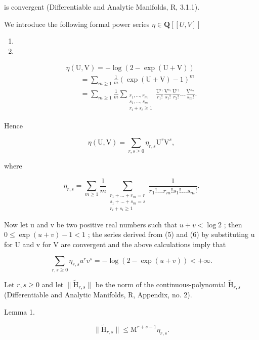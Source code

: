 is convergent (Differentiable and Analytic Manifolds, R, 3.1.1).

We introduce the following formal power series \(\eta\in\mathbf{Q}[[U,V]]\)

\begin{enumerate}
\def\labelenumi{(\arabic{enumi})}
\setcounter{enumi}{3}
\tightlist
\item
\item
\end{enumerate}

\[
\begin{array}{l}\eta (\mathrm{U},\mathrm{V}) = -\log (2 - \exp (\mathrm{U} + \mathrm{V}))\\ \qquad = \sum_{m\geqslant 1}\frac{1}{m} (\exp (\mathrm{U} + \mathrm{V}) - 1)^{m}\\ \qquad = \sum_{m\geqslant 1}\frac{1}{m}\sum_{\substack{r_{1},\ldots ,r_{m}\\ s_{1},\ldots ,s_{m}\\ r_{i} + s_{i}\geqslant 1}}\frac{\mathrm{U}^{r_{1}}}{r_{1}!}\frac{\mathrm{V}^{s_{1}}}{s_{1}!}\frac{\mathrm{U}^{r_{2}}}{r_{2}!}\dots \frac{\mathrm{V}^{s_{m}}}{s_{m}!}. \end{array}\tag{6}
\]

Hence

\[
\eta (\mathrm{U}, \mathrm{V}) = \sum_ {r, s \geqslant 0} \eta_ {r, s} \mathrm{U} ^ {r} \mathrm{V} ^ {s},\tag{7}
\]

where

\[
\eta_{r,s} = \sum_{m\geqslant 1}\frac{1}{m}\sum_{\substack{r_{1} + \dots +r_{m} = r\\ s_{1} + \dots +s_{m} = s\\ r_{i} + s_{i}\geqslant 1}}\frac{1}{r_{1}!\ldots r_{m}!s_{1}!\ldots s_{m}!}.\tag{8}
\]

Now let u and v be two positive real numbers such that \(u + v < \log 2\) ; then \(0 \leqslant \exp(u + v) - 1 < 1\) ; the series derived from (5) and (6) by substituting u for U and v for V are convergent and the above calculations imply that

\[
\sum_ {r, s \geqslant 0} \eta_ {r, s} u ^ {r} v ^ {s} = - \log (2 - \exp (u + v)) <   + \infty .\tag{9}
\]

Let \(r, s \geqslant 0\) and let \(\| \tilde{\mathrm{H}}_{r,s} \|\) be the norm of the continuous-polynomial \(\tilde{\mathrm{H}}_{r,s}\) (Differentiable and Analytic Manifolds, R, Appendix, no. 2).

Lemma 1.

\[
\| \widetilde {\mathrm{H}} _ {r, s} \| \leqslant \mathrm{M} ^ {r + s - 1} \eta_ {r, s}.
\]

